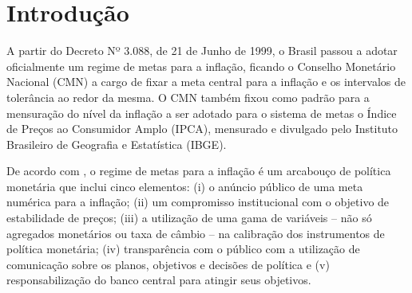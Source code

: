 \documentclass[
	article,			%
	11pt,				%
	oneside,			%
	a4paper,			%
	english,			%
	brazil,				%
	]{abntex2}
\begin{document}
 
 


\textual

\section{Introdução}

	A partir do Decreto Nº 3.088, de 21 de Junho de 1999, o Brasil passou a adotar oficialmente um regime de metas para a inflação, ficando o Conselho Monetário Nacional (CMN) a cargo de fixar a meta central para a inflação e os intervalos de tolerância ao redor da mesma. O CMN também fixou como padrão para a mensuração do nível da inflação a ser adotado para o sistema de metas o Índice de Preços ao Consumidor Amplo (IPCA), mensurado e divulgado pelo Instituto Brasileiro de Geografia e Estatística (IBGE).
	
	De acordo com , o regime de metas para a inflação é um arcabouço de política monetária que inclui cinco elementos: (i) o anúncio público de uma meta numérica para a inflação; (ii) um compromisso institucional com o objetivo de estabilidade de preços; (iii) a utilização de uma gama de variáveis – não só agregados monetários ou taxa de câmbio – na calibração dos instrumentos de política monetária; (iv) transparência com o público com a utilização de comunicação sobre os planos, objetivos e decisões de política e (v) responsabilização do banco central para atingir seus objetivos.
	
\end{document}

